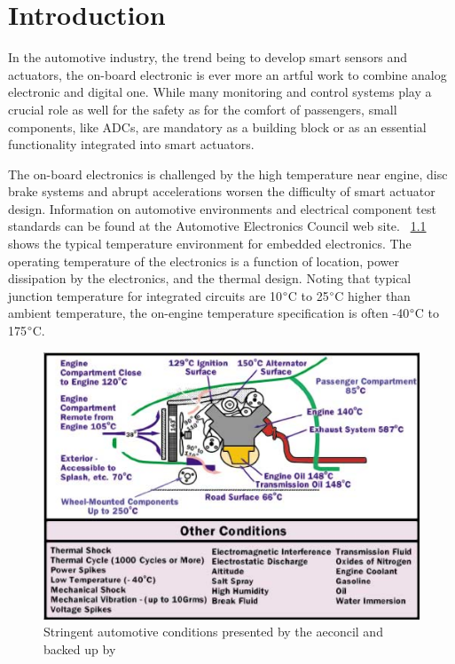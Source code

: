 
\chapter{Introduction}  %

\ifpdf
    \graphicspath{{Chapter1/Figs/Raster/}{Chapter1/Figs/PDF/}{Chapter1/Figs/}}
\else
    \graphicspath{{Chapter1/Figs/Vector/}{Chapter1/Figs/}}
\fi

In the automotive industry, the trend being to develop smart sensors and actuators, the on-board electronic is ever more an artful work to combine analog electronic and digital one. While many monitoring and control systems play a crucial role as well for the safety as for the comfort of passengers, small components, like ADCs, are mandatory as a building block or as an essential functionality integrated into smart actuators.

The on-board electronics is challenged by the high temperature near engine, disc brake systems and abrupt accelerations worsen the difficulty of smart actuator design. Information on automotive environments and electrical component test standards can be found at the Automotive Electronics Council web site. \figurename~\ref{fig:automotive-cond} shows the typical temperature environment for embedded electronics. The operating temperature of the electronics is a function of location, power dissipation by the electronics, and the thermal design. Noting that typical junction temperature for integrated circuits are 10\(\degree \)C to 25\(\degree \)C higher than ambient temperature, the on-engine temperature specification is often -40\(\degree \)C to 175\(\degree \)C.

\begin{figure}[htp]
    \centering
    \includegraphics[width=.8\textwidth]{Chapter1/Figs/automotive_cond.png}
    \caption{Stringent automotive conditions presented by the aeconcil and backed up by~\cite{1393072,ISO16750}}
    \label{fig:automotive-cond}
\end{figure}

